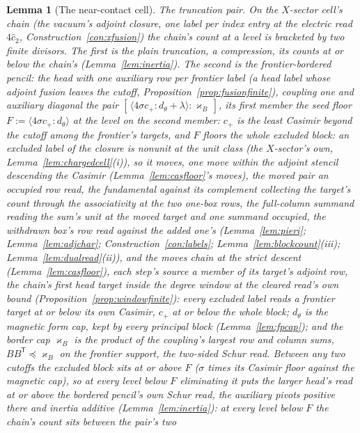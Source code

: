 \documentclass[11pt]{article}
\newtheorem{lemma}{Lemma}
\theoremstyle{definition}
\begin{document}
\begin{lemma}[The near-contact cell]
\emph{The truncation pair.} On the $X$-sector cell's chain (the
vacuum's adjoint closure, one label per index entry at the
electric read $4\hat c_2$, Construction~\ref{con:xfusion}) the
chain's count at a level is bracketed by two finite divisors. The
first is the plain truncation, a compression, its counts at or
below the chain's (Lemma~\ref{lem:inertia}). The second is the
\emph{frontier-bordered} pencil: the head with one auxiliary row
per frontier label (a head label whose adjoint fusion leaves the
cutoff, Proposition~\ref{prop:fusionfinite}), coupling one and
auxiliary diagonal the pair
$[\,\langle 4\sigma c_+\!:\!d_\theta+\lambda\rangle:\varkappa_B\,]$,
its first member the seed floor
$F:=\langle 4\sigma c_+\!:\!d_\theta\rangle$ at the level on the
second member: $c_+$ is the least
Casimir beyond the cutoff among the frontier's targets, and $F$
floors the whole excluded block: an excluded label of the closure
is nonunit at the unit class (the $X$-sector's own,
Lemma~\ref{lem:chargedcell}(i)), so it moves, one move within
the adjoint stencil descending the Casimir
(Lemma~\ref{lem:casfloor}'s moves), the moved pair an occupied
row read, the fundamental against its complement collecting the
target's count through the associativity at the two one-box
rows, the full-column summand reading the sum's unit at the
moved target and one summand occupied, the withdrawn box's row
read against the added one's (Lemma~\ref{lem:pieri};
Lemma~\ref{lem:adjchar}; Construction~\ref{con:labels};
Lemma~\ref{lem:blockcount}(iii); Lemma~\ref{lem:dualread}(ii)),
and the moves chain at the strict descent
(Lemma~\ref{lem:casfloor}), each step's source a member of its
target's adjoint row, the chain's first head target inside the
degree window at the cleared read's own bound
(Proposition~\ref{prop:windowfinite}): every excluded label reads
a frontier target at or below its own Casimir, $c_+$ at or below
the whole block; $d_\theta$ is the
magnetic form cap, kept by every principal block
(Lemma~\ref{lem:fpcap}); and the \emph{border cap} $\varkappa_B$
is the product of the coupling's largest row and column sums,
$BB^{\mathsf T}\preceq\varkappa_B$ on the frontier
support, the two-sided Schur read. Between any two cutoffs the
excluded block sits at or above $F$ ($\sigma$ times its Casimir
floor against the magnetic cap), so at every level below $F$
eliminating it puts the larger head's read at or above the
bordered pencil's own Schur read, the auxiliary pivots positive
there and inertia additive (Lemma~\ref{lem:inertia}): at every
level below $F$ the chain's count sits between the pair's two

\end{lemma}
\end{document}
